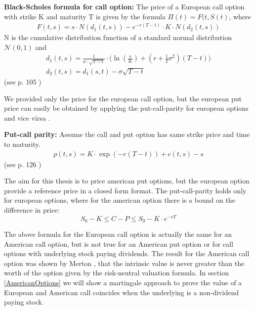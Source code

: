 \theoremstyle{proposition}
\begin{proposition}{}\label{BS-price-EuroCall}
\textbf{Black-Scholes formula for call option:} The price of a European call option with strike K and maturity T is given by the formula  $\Pi(t)=F(t,S(t)$, where
\begin{align*}
F(t,s)=s \cdot N(d_1(t,s)) - e^{-r(T-t)}\cdot K \cdot N(d_2(t,s))
\end{align*}
N is the cumulative distribution function of a standard normal distribution $\mathcal{N}(0,1)$ and
\begin{align*}
d_1(t,s)=\frac{1}{\sigma\cdot \sqrt{T-t}} \cdot \bigg( \ln(\frac{s}{K}) + (r+\frac{1}{2} \sigma^2) (T-t) \bigg)\\
d_2(t,s)=d_1(s,t)-\sigma \sqrt{T-t}
\end{align*}
(see p. 105 \parencite{finKont})
\end{proposition}
We provided only the price for the european call option, but the european put price can easily be obtained by applying the put-call-parity for european options and vice virsa .

\theoremstyle{proposition}
\begin{proposition}{}\label{put-call-parity}
\textbf{Put-call parity:} 
Assume the call and put option has same strike price and time to maturity.
\begin{align*}
p(t,s)=K\cdot \exp(-r(T-t))+c(t,s)-s
\end{align*}
(see p. 126 \parencite{finKont})
\end{proposition}

The aim for this thesis is to price american put options, but the european option provide a reference price in a closed form format. The put-call-parity holds only for european options, where for the american option there is a bound on the difference in price:
$$S_0 - K \leq C-P \leq S_0 - K \cdot e^{-rT}$$

The above formula for the European call option is actually the same for an American call option, but is not true for an American put option or for call options with underlying stock paying dividends. The result for the American call option was shown by Merton \parencite{Merton73}, that the intrinsic value is never greater than the worth of the option given by the risk-neutral valuation formula. In section \ref{AmericanOptions} we will show a martingale approach to prove the value of a European and American call coincides when the underlying is a non-dividend paying stock.

